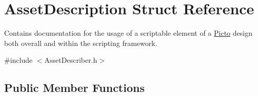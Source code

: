 \hypertarget{struct_asset_description}{\section{Asset\-Description Struct Reference}
\label{struct_asset_description}
}


Contains documentation for the usage of a scriptable element of a \hyperlink{namespace_picto}{Picto} design both overall and within the scripting framework.  




{\ttfamily \#include $<$Asset\-Describer.\-h$>$}

\subsection*{Public Member Functions}
